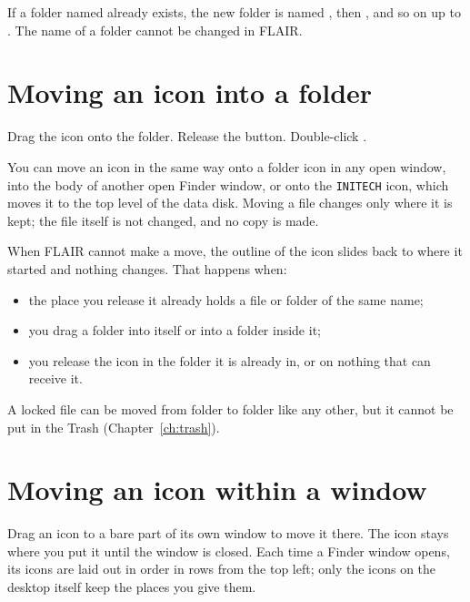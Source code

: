 
If a folder named  already exists, the new folder is named
, then , and so on up to .
The name of a folder cannot be changed in FLAIR.

\section{Moving an icon into a folder}
\begin{TaskSteps}
\Step Drag the  icon onto the  folder.
\Step Release the button.
\Step Double-click .
\end{TaskSteps}


You can move an icon in the same way onto a folder icon in any open
window, into the body of another open Finder window, or onto the
\texttt{INITECH} icon, which moves it to the top level of the data disk.
Moving a file changes only where it is kept; the file itself is not
changed, and no copy is made.

When FLAIR cannot make a move, the outline of the icon slides back to where
it started and nothing changes.  That happens when:
\begin{itemize}
\item the place you release it already holds a file or folder of the same
  name;
\item you drag a folder into itself or into a folder inside it;
\item you release the icon in the folder it is already in, or on nothing
  that can receive it.
\end{itemize}
A locked file can be moved from folder to folder like any other, but it
cannot be put in the Trash (Chapter~\ref{ch:trash}).

\section{Moving an icon within a window}
Drag an icon to a bare part of its own window to move it there.  The icon
stays where you put it until the window is closed.  Each time a Finder
window opens, its icons are laid out in order in rows from the top left;
only the icons on the desktop itself keep the places you give them.

